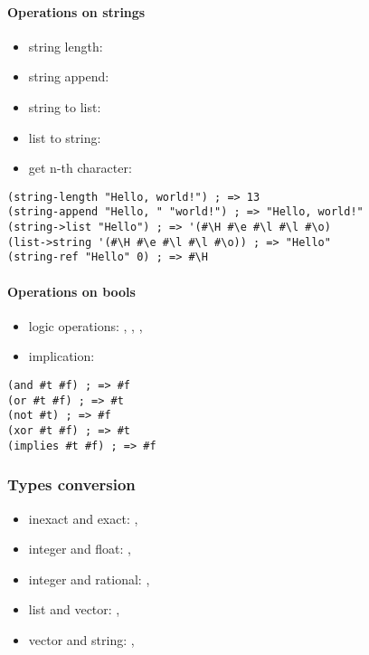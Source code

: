 \documentclass[a4paper,landscape,10pt]{article}
\begin{document}
\begin{multicols*}{2}
  \paragraph{Operations on strings}

  \begin{itemize}
    \item string length: 
    \item string append: 
    \item string to list: 
    \item list to string: 
    \item get n-th character: 
  \end{itemize}

  \begin{lstlisting}[language=Racket]
(string-length "Hello, world!") ; => 13
(string-append "Hello, " "world!") ; => "Hello, world!"
(string->list "Hello") ; => '(#\H #\e #\l #\l #\o)
(list->string '(#\H #\e #\l #\l #\o)) ; => "Hello"
(string-ref "Hello" 0) ; => #\H
\end{lstlisting}

  \paragraph{Operations on bools}

  \begin{itemize}
    \item logic operations: , , , 
    \item implication: 
  \end{itemize}

  \begin{lstlisting}[language=Racket]
(and #t #f) ; => #f
(or #t #f) ; => #t
(not #t) ; => #f
(xor #t #f) ; => #t
(implies #t #f) ; => #f
\end{lstlisting}

  \subsubsection{Types conversion}

  \begin{itemize}
    \item inexact and exact: , 
    \item integer and float: , 
    \item integer and rational: , 
    \item list and vector: , 
    \item vector and string: , 
  \end{itemize}


\end{multicols*}
\end{document}
